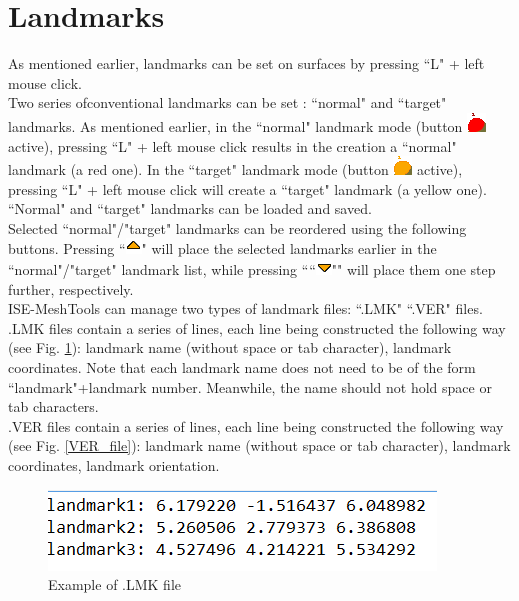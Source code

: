 \section{Landmarks}
As mentioned earlier, landmarks can be set on surfaces by pressing ``L" + left mouse click.\\

Two series ofconventional landmarks can be set : ``normal" and ``target" landmarks. As mentioned earlier, in the ``normal" landmark mode (button \includegraphics[scale=0.7]{images/pixmap/Landmarks4.png} active), pressing ``L" + left mouse click results in
the creation a ``normal" landmark (a red one). In the ``target" landmark mode (button \includegraphics[scale=0.7]{images/pixmap/Landmarks6.png} active),
pressing ``L" + left mouse click will create a ``target" landmark (a yellow one). ``Normal" and ``target" landmarks can be loaded and saved.\\
Selected ``normal"/"target" landmarks can be reordered using the following buttons. Pressing ``\includegraphics[scale=0.7]{images/pixmap/s_dessous_17.png}"
will place the selected landmarks earlier in the ``normal"/"target" landmark list, while pressing ````\includegraphics[scale=0.7]{images/pixmap/s_dessus_17.png}""
will place them one step further, respectively.\\
ISE-MeshTools can manage two types of landmark files: ``.LMK" ``.VER" files.\\ .LMK files contain a series of lines, each line
being constructed the following way (see Fig. \ref{LMK_file}): landmark
name (without space or tab character),
landmark coordinates. Note that each landmark name does not need to be of the form ``landmark"+landmark number. Meanwhile, the name should not hold space or tab
characters.
\\
.VER files contain a series
of lines, each line being
constructed the following
way (see Fig. \ref{VER_file}): landmark name (without space or tab character), landmark coordinates, landmark orientation.

\begin{figure}
  \centering
  \includegraphics[scale=0.7]{images/Landmarks/LMK_file.png}
 \caption{Example of .LMK file}
\label{LMK_file}
\end{figure}

